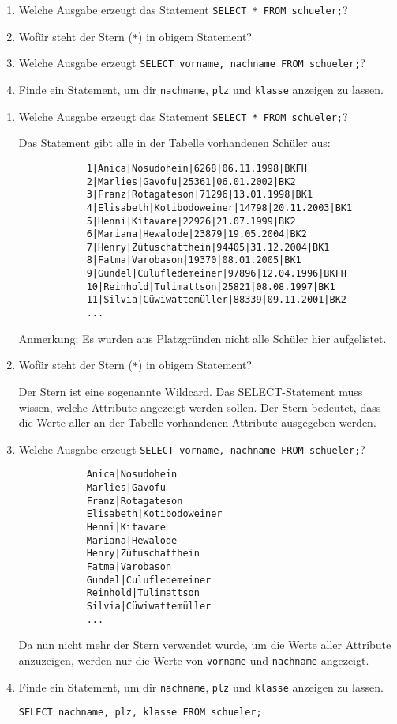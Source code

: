 \begin{Exercise}[title={Beantworte folgende Fragen mit Hilfe deiner Datenbank und dem Internet.}, label=Select]
	\begin{enumerate}
		\item Welche Ausgabe erzeugt das Statement \lstinline!SELECT * FROM schueler;!?
		\item Wofür steht der Stern (\lstinline!*!) in obigem Statement?
		\item Welche Ausgabe erzeugt \lstinline!SELECT vorname, nachname FROM schueler;!?
		\item Finde ein Statement, um dir \lstinline!nachname!, \lstinline!plz! und \lstinline!klasse! anzeigen zu lassen.
	\end{enumerate}
\end{Exercise}
\begin{Answer}[ref=Select]
	\begin{enumerate}
		\item Welche Ausgabe erzeugt das Statement \lstinline!SELECT * FROM schueler;!?

		Das Statement gibt alle in der Tabelle vorhandenen Schüler aus:

		\begin{lstlisting}
			1|Anica|Nosudohein|6268|06.11.1998|BKFH
			2|Marlies|Gavofu|25361|06.01.2002|BK2
			3|Franz|Rotagateson|71296|13.01.1998|BK1
			4|Elisabeth|Kotibodoweiner|14798|20.11.2003|BK1
			5|Henni|Kitavare|22926|21.07.1999|BK2
			6|Mariana|Hewalode|23879|19.05.2004|BK2
			7|Henry|Zütuschatthein|94405|31.12.2004|BK1
			8|Fatma|Varobason|19370|08.01.2005|BK1
			9|Gundel|Culufledemeiner|97896|12.04.1996|BKFH
			10|Reinhold|Tulimattson|25821|08.08.1997|BK1
			11|Silvia|Cüwiwattemüller|88339|09.11.2001|BK2
			...\end{lstlisting}
		Anmerkung: Es wurden aus Platzgründen nicht alle Schüler hier aufgelistet.
		\item Wofür steht der Stern (\lstinline!*!) in obigem Statement?

		Der Stern ist eine sogenannte Wildcard. Das SELECT-Statement muss wissen, welche Attribute angezeigt werden sollen. Der Stern bedeutet, dass die Werte aller an der Tabelle vorhandenen Attribute ausgegeben werden.
		\item Welche Ausgabe erzeugt \lstinline!SELECT vorname, nachname FROM schueler;!?
		\begin{lstlisting}
			Anica|Nosudohein
			Marlies|Gavofu
			Franz|Rotagateson
			Elisabeth|Kotibodoweiner
			Henni|Kitavare
			Mariana|Hewalode
			Henry|Zütuschatthein
			Fatma|Varobason
			Gundel|Culufledemeiner
			Reinhold|Tulimattson
			Silvia|Cüwiwattemüller
			...\end{lstlisting}
		Da nun nicht mehr der Stern verwendet wurde, um die Werte aller Attribute anzuzeigen, werden nur die Werte von \lstinline!vorname! und \lstinline!nachname! angezeigt.
		\item Finde ein Statement, um dir \lstinline!nachname!, \lstinline!plz! und \lstinline!klasse! anzeigen zu lassen.

		\lstinline!SELECT nachname, plz, klasse FROM schueler;!
	\end{enumerate}
\end{Answer}